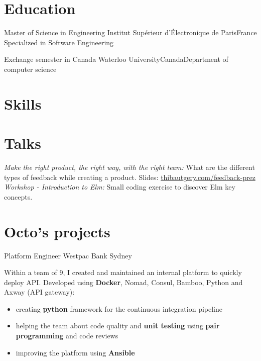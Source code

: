 \documentclass[11pt,a4paper]{moderncv}
\begin{document}
\section{Education}
{Master of Science in Engineering}
{Institut Supérieur d'Électronique de Paris}{France}
{Specialized in Software Engineering}{}

{Exchange semester in Canada}
{Waterloo University}{Canada}{Department of computer science}{}


\section{Skills}
\vspace{1mm}

\clearpage

\section{Talks}
\cvline{}
{
\textit{Make the right product, the right way, with the right team:}
What are the different types of feedback while creating a product. Slides:
\href{http://www.thibautgery.com/feedback-prez}{thibautgery.com/feedback-prez} 
}
\cvline{}
{
\textit{Workshop - Introduction to Elm:}
Small coding exercise to discover Elm key concepts.
}

\section{Octo's projects}

{Platform Engineer}
{Westpac}
{Bank}
{Sydney}
{
Within a team of 9, I created and maintained an internal platform to quickly deploy API. Developed using \textbf{Docker}, Nomad, Consul, Bamboo, Python and Axway (API gateway):
\begin{itemize}
\item creating \textbf{python} framework for the continuous integration pipeline
\item helping the team about code quality and \textbf{unit testing} using \textbf{pair programming} and code reviews
\item improving the platform using \textbf{Ansible}
\end{itemize}
\vspace{5mm}
}
\end{document}
